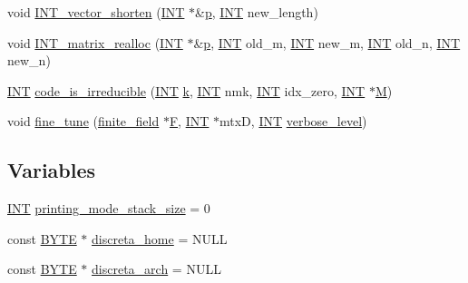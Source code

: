 \begin{DoxyCompactItemize}
\item 
void \mbox{\hyperlink{global_8_c_a246199d005ae23aad214026100d03048}{I\+N\+T\+\_\+vector\+\_\+shorten}} (\mbox{\hyperlink{galois_8h_a09fddde158a3a20bd2dcadb609de11dc}{I\+NT}} $\ast$\&\mbox{\hyperlink{alphabet2_8_c_a533391314665d6bf1b5575e9a9cd8552}{p}}, \mbox{\hyperlink{galois_8h_a09fddde158a3a20bd2dcadb609de11dc}{I\+NT}} new\+\_\+length)
\item 
void \mbox{\hyperlink{global_8_c_a481cf41bb44ee60f39fff836871025c8}{I\+N\+T\+\_\+matrix\+\_\+realloc}} (\mbox{\hyperlink{galois_8h_a09fddde158a3a20bd2dcadb609de11dc}{I\+NT}} $\ast$\&\mbox{\hyperlink{alphabet2_8_c_a533391314665d6bf1b5575e9a9cd8552}{p}}, \mbox{\hyperlink{galois_8h_a09fddde158a3a20bd2dcadb609de11dc}{I\+NT}} old\+\_\+m, \mbox{\hyperlink{galois_8h_a09fddde158a3a20bd2dcadb609de11dc}{I\+NT}} new\+\_\+m, \mbox{\hyperlink{galois_8h_a09fddde158a3a20bd2dcadb609de11dc}{I\+NT}} old\+\_\+n, \mbox{\hyperlink{galois_8h_a09fddde158a3a20bd2dcadb609de11dc}{I\+NT}} new\+\_\+n)
\item 
\mbox{\hyperlink{galois_8h_a09fddde158a3a20bd2dcadb609de11dc}{I\+NT}} \mbox{\hyperlink{global_8_c_a9b4d3e77d06944060e008288a375902d}{code\+\_\+is\+\_\+irreducible}} (\mbox{\hyperlink{galois_8h_a09fddde158a3a20bd2dcadb609de11dc}{I\+NT}} \mbox{\hyperlink{simeon_8_c_a43fa990200c3ddd47c35f151bd4d66bf}{k}}, \mbox{\hyperlink{galois_8h_a09fddde158a3a20bd2dcadb609de11dc}{I\+NT}} nmk, \mbox{\hyperlink{galois_8h_a09fddde158a3a20bd2dcadb609de11dc}{I\+NT}} idx\+\_\+zero, \mbox{\hyperlink{galois_8h_a09fddde158a3a20bd2dcadb609de11dc}{I\+NT}} $\ast$\mbox{\hyperlink{plane__search_8_c_ad2d23ebd03187a91edd45b1d5e496265}{M}})
\item 
void \mbox{\hyperlink{global_8_c_ab1f4f7f57240dfae62fb2126547fa8e6}{fine\+\_\+tune}} (\mbox{\hyperlink{classfinite__field}{finite\+\_\+field}} $\ast$\mbox{\hyperlink{simeon_8_c_a21a61c535ff7d9d4b674461d3b19fffa}{F}}, \mbox{\hyperlink{galois_8h_a09fddde158a3a20bd2dcadb609de11dc}{I\+NT}} $\ast$mtxD, \mbox{\hyperlink{galois_8h_a09fddde158a3a20bd2dcadb609de11dc}{I\+NT}} \mbox{\hyperlink{simeon_8_c_a818073fbcc2f439e7c56952f67386122}{verbose\+\_\+level}})
\end{DoxyCompactItemize}
\subsection*{Variables}
\begin{DoxyCompactItemize}
\item 
\mbox{\hyperlink{galois_8h_a09fddde158a3a20bd2dcadb609de11dc}{I\+NT}} \mbox{\hyperlink{global_8_c_aa649d2d3074fb4d8b6387f653683f49e}{printing\+\_\+mode\+\_\+stack\+\_\+size}} = 0
\item 
const \mbox{\hyperlink{galois_8h_ab6cc7b4aeb6ea31aba2b3fbfc83ff5e6}{B\+Y\+TE}} $\ast$ \mbox{\hyperlink{global_8_c_a95cd49b8fcd1d229d4155f19115aef89}{discreta\+\_\+home}} = N\+U\+LL
\item 
const \mbox{\hyperlink{galois_8h_ab6cc7b4aeb6ea31aba2b3fbfc83ff5e6}{B\+Y\+TE}} $\ast$ \mbox{\hyperlink{global_8_c_af6044514502c67e3178140359be347ec}{discreta\+\_\+arch}} = N\+U\+LL
\end{DoxyCompactItemize}


